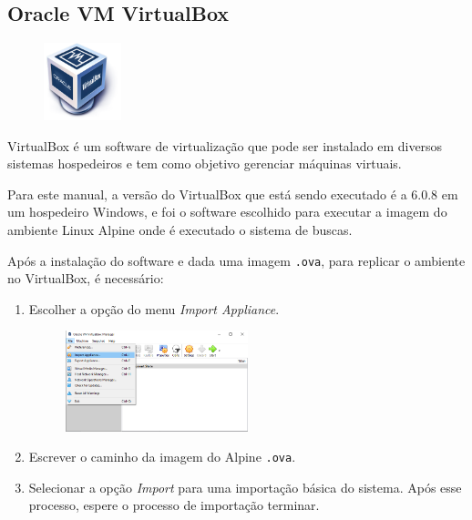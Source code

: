 \subsection{Oracle VM VirtualBox}\label{vbox}

\begin{figure} %
    \centering
    \includegraphics[width=0.2\textwidth]{../images/vbox.png}
\end{figure}

VirtualBox é um software de virtualização que pode ser instalado em diversos sistemas hospedeiros e tem como objetivo gerenciar máquinas virtuais.

Para este manual, a versão do VirtualBox que está sendo executado é a 6.0.8 em um hospedeiro Windows, e foi o software escolhido para executar a imagem do ambiente Linux Alpine onde é executado o sistema de buscas.

Após a instalação do software e dada uma imagem \lstinline{.ova}, para replicar o ambiente no VirtualBox, é necessário:
\begin{enumerate}
    \item Escolher a opção do menu \textit{Import Appliance}.
     \begin{figure}[h]
        \centering
        \includegraphics[width=0.5\textwidth]{images/vbox1.png}
    \end{figure}
    \item Escrever o caminho da imagem do Alpine \lstinline{.ova}.
    \item Selecionar a opção \textit{Import} para uma importação básica do sistema. Após esse processo, espere o processo de importação terminar.
\end{enumerate}

